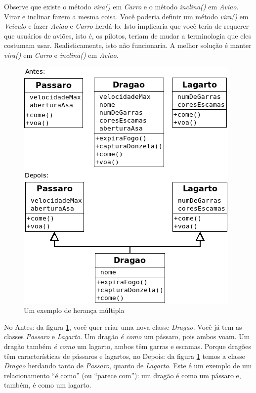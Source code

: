 \documentclass[
	11pt,				%
	openright,
	twoside,			%
	a4paper,			%
	english,			%
	french,
	brazil,				%
	sumario=tradicional
	]{abntex2}
\begin{document}
Observe que existe o método \emph{vira()} em \emph{Carro} e o método \emph{inclina()} em \emph{Aviao}. Virar e inclinar fazem a mesma coisa. Você poderia definir um método \emph{vira()} em \emph{Veiculo} e fazer \emph{Aviao} e \emph{Carro} herdá-lo. Isto implicaria que você teria de requerer que usuários de aviões, isto é, os pilotos, teriam de mudar a terminologia que eles costumam usar. Realisticamente, isto não funcionaria. A melhor solução é manter \emph{vira()} em \emph{Carro} e \emph{inclina()} em \emph{Aviao}.

\begin{figure}
\begin{center}
\includegraphics[scale=0.6]{herMultCls.png} 
\caption{Um exemplo de herança múltipla} \label{fig:uml4}
\end{center}
\end{figure}

No Antes: da figura \ref{fig:uml4}, você quer criar uma nova classe \emph{Dragao}. Você já tem as classes \emph{Passaro} e \emph{Lagarto}. Um dragão \textit{é como} um pássaro, pois ambos voam. Um dragão também \textit{é como} um lagarto, ambos têm garras e escamas. Porque dragões têm características de pássaros e lagartos, no Depois: da figura \ref{fig:uml4} temos a classe \emph{Dragao} herdando tanto de \emph{Passaro}, quanto de \emph{Lagarto}. Este é um exemplo de um relacionamento ``é como'' (ou ``parece com''): um dragão é como um pássaro e, também, é como um lagarto.
\end{document}
